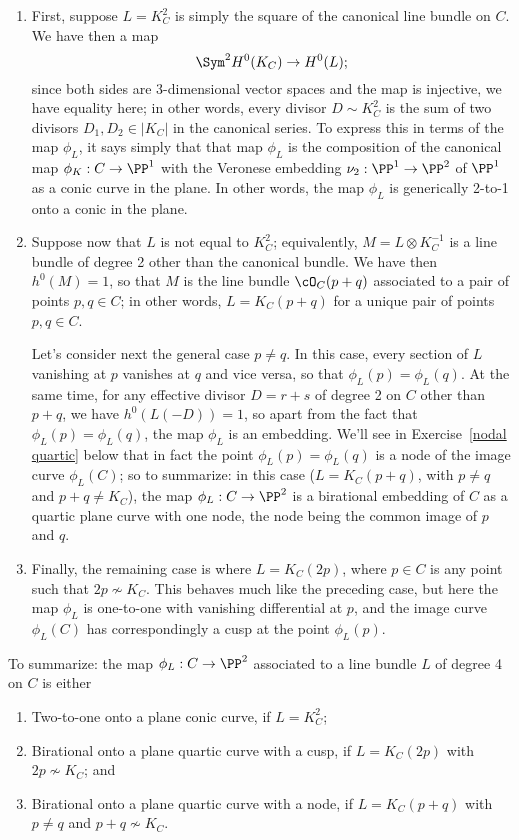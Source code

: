 \begin{enumerate}
\item First, suppose $L = K_C^2$ is simply the square of the canonical line bundle on $C$. We have then a map
$$
\Sym^2 H^0(K_C) \to H^0(L);
$$
since both sides are 3-dimensional vector spaces and the map is injective, we have equality here; in other words, every divisor $D \sim K_C^2$ is the sum of two divisors $D_1, D_2 \in |K_C|$ in the canonical series. To express this in terms of the map $\phi_L$, it says simply that that map $\phi_L$ is the composition of the canonical map $\phi_K : C \to \PP^1$ with the Veronese embedding $\nu_2 : \PP^1 \to \PP^2$ of $\PP^1$ as a conic curve in the plane. In other words, the map $\phi_L$ is generically 2-to-1 onto a conic in the plane.

\item Suppose now that $L$ is not equal to $K_C^2$; equivalently, $M = L \otimes K_C^{-1}$ is a line bundle of degree 2 other than the canonical bundle. We have then $h^0(M) = 1$, so that $M$ is the line bundle $\cO_C(p+q)$ associated to a pair of points $p, q \in C$; in other words, $L = K_C(p+q)$ for a unique pair of points $p, q \in C$.

Let's consider next the general case $p \neq q$. In this case, every section of $L$ vanishing at $p$ vanishes at $q$ and vice versa, so that $\phi_L(p) = \phi_L(q)$. At the same time, for any effective divisor $D = r+s$ of degree 2 on $C$  other than $p+q$, we have $h^0(L(-D)) = 1$, so apart from the fact that $\phi_L(p) = \phi_L(q)$, the map $\phi_L$ is an embedding. We'll see in Exercise~\ref{nodal quartic} below that in fact the point $\phi_L(p) = \phi_L(q)$ is a node of the image curve $\phi_L(C)$; so to summarize: in this case ($L = K_C(p+q)$, with $p \neq q$ and $p+q \neq K_C$), the map $\phi_L : C \to \PP^2$ is a birational embedding of $C$ as a quartic plane curve with one node, the node being the common image of $p$ and $q$.

\item Finally, the remaining case is where $L = K_C(2p)$, where $p \in C$ is any point such that $2p \not\sim K_C$. This behaves much like the preceding case, but here the map $\phi_L$ is one-to-one with vanishing differential at $p$, and the image curve $\phi_L(C)$ has correspondingly a cusp at the point $\phi_L(p)$.
\end{enumerate}

To summarize: the map $\phi_L : C \to \PP^2$ associated to a line bundle $L$ of degree 4 on $C$ is either
\begin{enumerate}
\item Two-to-one onto a plane conic curve, if $L = K_C^2$;
\item Birational onto a plane quartic curve with a cusp, if $L = K_C(2p)$ with $2p \not\sim K_C$; and
\item Birational onto a plane quartic curve with a node, if $L = K_C(p+q)$ with $p \neq q$ and $p+q \not\sim K_C$.
\end{enumerate}

